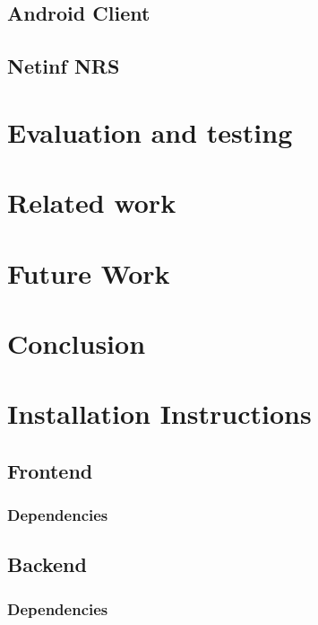 \documentclass[11pt]{report}
\begin{document}
\section {Android Client}
\section {Netinf NRS}
\chapter{Evaluation and testing}
\chapter{Related work}
\chapter{Future Work}
\chapter{Conclusion}
\chapter{Installation Instructions}
\section {Frontend}
\subsection {Dependencies}
\section {Backend}
\subsection {Dependencies}
\end{document}
